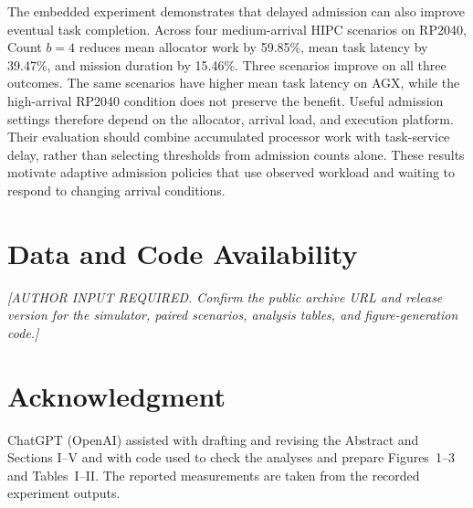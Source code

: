 \documentclass[conference]{IEEEtran}
\newcommand{\platformtodo}[1]{\textit{[AUTHOR INPUT REQUIRED. #1]}}
\begin{document}
The embedded experiment demonstrates that delayed admission can also improve eventual task completion. Across four medium-arrival HIPC scenarios on RP2040, Count $b=4$ reduces mean allocator work by 59.85\%, mean task latency by 39.47\%, and mission duration by 15.46\%. Three scenarios improve on all three outcomes. The same scenarios have higher mean task latency on AGX, while the high-arrival RP2040 condition does not preserve the benefit. Useful admission settings therefore depend on the allocator, arrival load, and execution platform. Their evaluation should combine accumulated processor work with task-service delay, rather than selecting thresholds from admission counts alone. These results motivate adaptive admission policies that use observed workload and waiting to respond to changing arrival conditions.

\section*{Data and Code Availability}
\platformtodo{Confirm the public archive URL and release version for the simulator, paired scenarios, analysis tables, and figure-generation code.}

\section*{Acknowledgment}
ChatGPT (OpenAI) assisted with drafting and revising the Abstract and Sections I--V and with code used to check the analyses and prepare Figures~1--3 and Tables~I--II. The reported measurements are taken from the recorded experiment outputs.



\end{document}
